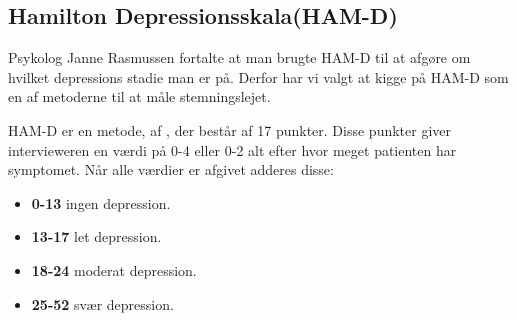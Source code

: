 \subsection{Hamilton Depressionsskala(HAM-D)}
Psykolog Janne Rasmussen fortalte at man brugte HAM-D til at afgøre om hvilket depressions stadie man er på.\cite[Afsnit 1.3, Møde med Psykolog Janne Rasmussen]{faelles}
Derfor har vi valgt at kigge på HAM-D som en af metoderne til at måle stemningslejet.

HAM-D er en metode, af \citet{ham_d}, der består af 17 punkter.
Disse punkter giver intervieweren en værdi på 0-4 eller 0-2 alt efter hvor meget patienten har symptomet.
Når alle værdier er afgivet adderes disse:
\begin{itemize}
	\item \textbf{0-13} ingen depression.
	\item \textbf{13-17} let depression.
	\item \textbf{18-24} moderat depression.
	\item \textbf{25-52} svær depression.
\end{itemize}

